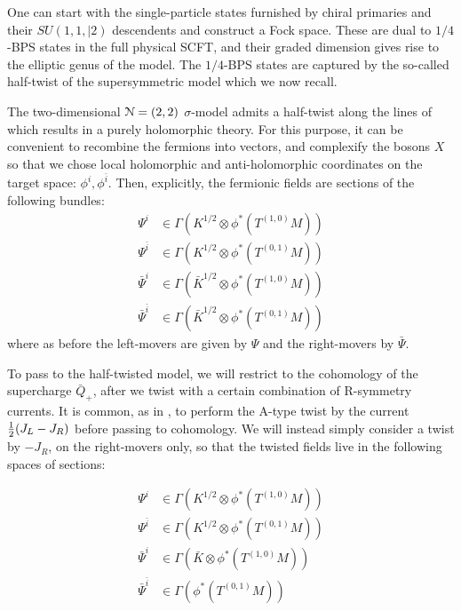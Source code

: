 \documentclass[../main.tex]{subfiles}
\begin{document}
One can start with the single-particle states furnished by chiral primaries and their $SU(1,1,|2)$ descendents and construct a Fock space. 
These are dual to $1/4$-BPS states in the full physical SCFT, and their graded dimension gives rise to the elliptic genus of the model.
The $1/4$-BPS states are captured by the so-called half-twist of the supersymmetric model which we now recall.

The two-dimensional $\mathcal{N}=(2,2)$ $\sigma$-model admits a half-twist along the lines of \cite{Kapustin, Witten} which results in a purely holomorphic theory.
For this purpose, it can be convenient to recombine the fermions into vectors, and complexify the bosons $X$ so that we chose local holomorphic and anti-holomorphic coordinates on the target space: $\phi^i, \phi^{\bar{i}}$. 
Then, explicitly, the fermionic fields are sections of the following bundles: 
\begin{align*}
\Psi^i &\in \Gamma(K^{1/2}\otimes \phi^*(T^{(1,0)}M))\\
\Psi^{\bar{i}}&\in \Gamma(K^{1/2}\otimes \phi^*(T^{(0,1)}M))\\
\bar{\Psi}^{i} &\in \Gamma(\bar{K}^{1/2}\otimes \phi^*(T^{(1,0)}M))\\
\bar{\Psi}^{\bar{i}} &\in \Gamma(\bar{K}^{1/2}\otimes \phi^*(T^{(0,1)}M))
\end{align*}  
where as before the left-movers are given by $\Psi$ and the right-movers by $\bar{\Psi}$.

To pass to the half-twisted model, we will restrict to the cohomology of the supercharge $\bar{Q}_+$, after we twist with a certain combination of R-symmetry currents. It is common, as in  \cite{Kapustin}, to perform the A-type twist by the current ${1 \over 2}(J_L - J_R)$ before passing to cohomology. We will instead simply consider a twist by $-J_R$, on the right-movers only, so that the twisted fields live in the following spaces of sections:

\begin{align*}
\Psi^i &\in \Gamma(K^{1/2}\otimes \phi^*(T^{(1,0)}M))\\
\Psi^{\bar{i}} &\in \Gamma(K^{1/2}\otimes \phi^*(T^{(0,1)}M))\\
\bar{\Psi}^i &\in \Gamma(\bar{K} \otimes\phi^*(T^{(1,0)}M))\\
\bar{\Psi}^{\bar{i}} &\in  \Gamma(\phi^*(T^{(0,1)}M))
\end{align*} 
\end{document}
